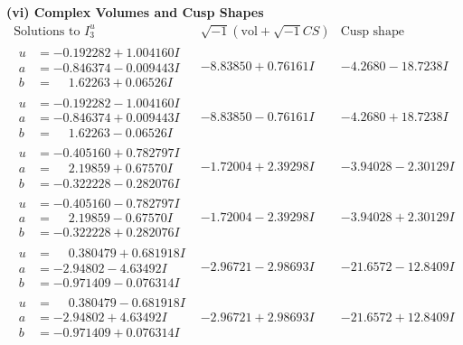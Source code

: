 \documentclass[1p]{elsarticle_modified}
\theoremstyle{definition}
\newcommand{\I}{\sqrt{-1}}
\begin{document}
\newpage\flushleft \textbf{(vi) Complex Volumes and Cusp Shapes}
$$\begin{array}{c|c|c}  
\text{Solutions to }I^u_{3}& \I (\text{vol} + \sqrt{-1}CS) & \text{Cusp shape}\\
 \hline 
\begin{aligned}
u &= -0.192282 + 1.004160 I \\
a &= -0.846374 - 0.009443 I \\
b &= \phantom{-}1.62263 + 0.06526 I\end{aligned}
 & -8.83850 + 0.76161 I & -4.2680 - 18.7238 I \\ \hline\begin{aligned}
u &= -0.192282 - 1.004160 I \\
a &= -0.846374 + 0.009443 I \\
b &= \phantom{-}1.62263 - 0.06526 I\end{aligned}
 & -8.83850 - 0.76161 I & -4.2680 + 18.7238 I \\ \hline\begin{aligned}
u &= -0.405160 + 0.782797 I \\
a &= \phantom{-}2.19859 + 0.67570 I \\
b &= -0.322228 - 0.282076 I\end{aligned}
 & -1.72004 + 2.39298 I & -3.94028 - 2.30129 I \\ \hline\begin{aligned}
u &= -0.405160 - 0.782797 I \\
a &= \phantom{-}2.19859 - 0.67570 I \\
b &= -0.322228 + 0.282076 I\end{aligned}
 & -1.72004 - 2.39298 I & -3.94028 + 2.30129 I \\ \hline\begin{aligned}
u &= \phantom{-}0.380479 + 0.681918 I \\
a &= -2.94802 - 4.63492 I \\
b &= -0.971409 - 0.076314 I\end{aligned}
 & -2.96721 - 2.98693 I & -21.6572 - 12.8409 I \\ \hline\begin{aligned}
u &= \phantom{-}0.380479 - 0.681918 I \\
a &= -2.94802 + 4.63492 I \\
b &= -0.971409 + 0.076314 I\end{aligned}
 & -2.96721 + 2.98693 I & -21.6572 + 12.8409 I \\ \hline\begin{aligned}

\end{aligned}
\end{array}$$
\end{document}

